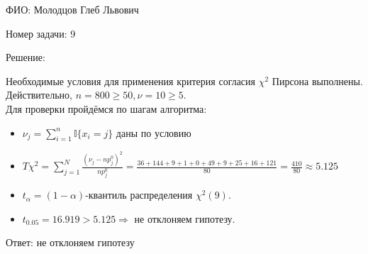 \documentclass[14pt]{extarticle}
\begin{document}
ФИО: Молодцов Глеб Львович

\vspace{10pt}

Номер задачи: 9

\vspace{10pt}

Решение:

\vspace{10pt}

Необходимые условия для применения критерия согласия $\chi ^2 $ Пирсона выполнены. Действительно, $n = 800 \geq 50, \nu = 10 \geq 5$.\\
Для проверки пройдёмся по шагам алгоритма:\\
\begin{itemize}
    \item $\nu_j = \sum\limits_{i=1}^{n} \mathbb{I}\{x_i = j\} $ даны по условию
    \item $T\chi^2 = \sum\limits_{j=1}^N\frac{(\nu_j - np_j^0)^2}{np_j^0} = \frac{36 + 144 + 9 + 1 + 0 + 49 + 9 + 25 + 16 + 121}{80} = \frac{410}{80} \approx 5.125$
    \item $t_\alpha = (1-\alpha) $-квантиль распределения $\chi^2(9)$.\\ \item $t_{0.05} = 16.919  > 5.125 \Rightarrow  $ не отклоняем гипотезу.
\end{itemize}
Ответ: не отклоняем гипотезу
\end{document}
